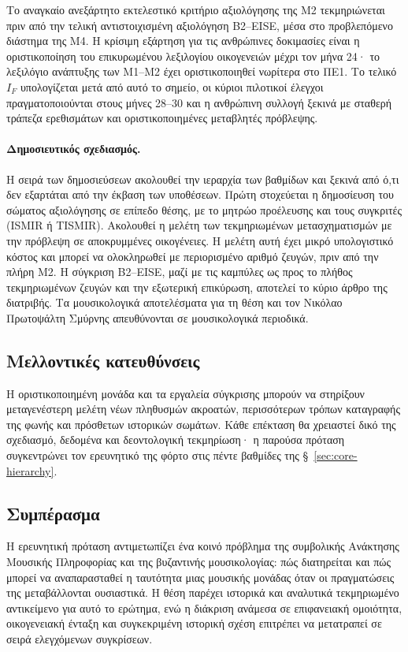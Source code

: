 \documentclass[11pt,a4paper]{article}
\begin{document}
Το αναγκαίο ανεξάρτητο εκτελεστικό κριτήριο αξιολόγησης της M2 τεκμηριώνεται πριν από την τελική αντιστοιχισμένη αξιολόγηση B2--EISE, μέσα στο προβλεπόμενο διάστημα της M4. Η κρίσιμη εξάρτηση για τις ανθρώπινες δοκιμασίες είναι η οριστικοποίηση του επικυρωμένου λεξιλογίου οικογενειών μέχρι τον μήνα 24· το λεξιλόγιο ανάπτυξης των M1--M2 έχει οριστικοποιηθεί νωρίτερα στο ΠΕ1. Το τελικό $I_F$ υπολογίζεται μετά από αυτό το σημείο, οι κύριοι πιλοτικοί έλεγχοι πραγματοποιούνται στους μήνες 28--30 και η ανθρώπινη συλλογή ξεκινά με σταθερή τράπεζα ερεθισμάτων και οριστικοποιημένες μεταβλητές πρόβλεψης.

\paragraph{Δημοσιευτικός σχεδιασμός.} Η σειρά των δημοσιεύσεων ακολουθεί την ιεραρχία των βαθμίδων και ξεκινά από ό,τι δεν εξαρτάται από την έκβαση των υποθέσεων. Πρώτη στοχεύεται η δημοσίευση του σώματος αξιολόγησης σε επίπεδο θέσης, με το μητρώο προέλευσης και τους συγκριτές (ISMIR ή TISMIR). Ακολουθεί η μελέτη των τεκμηριωμένων μετασχηματισμών με την πρόβλεψη σε αποκρυμμένες οικογένειες. Η μελέτη αυτή έχει μικρό υπολογιστικό κόστος και μπορεί να ολοκληρωθεί με περιορισμένο αριθμό ζευγών, πριν από την πλήρη M2. Η σύγκριση B2--EISE, μαζί με τις καμπύλες ως προς το πλήθος τεκμηριωμένων ζευγών και την εξωτερική επικύρωση, αποτελεί το κύριο άρθρο της διατριβής. Τα μουσικολογικά αποτελέσματα για τη θέση και τον Νικόλαο Πρωτοψάλτη Σμύρνης απευθύνονται σε μουσικολογικά περιοδικά.


\subsection{Μελλοντικές κατευθύνσεις}

Η οριστικοποιημένη μονάδα και τα εργαλεία σύγκρισης μπορούν να στηρίξουν μεταγενέστερη μελέτη νέων πληθυσμών ακροατών, περισσότερων τρόπων καταγραφής της φωνής και πρόσθετων ιστορικών σωμάτων. Κάθε επέκταση θα χρειαστεί δικό της σχεδιασμό, δεδομένα και δεοντολογική τεκμηρίωση· η παρούσα πρόταση συγκεντρώνει τον ερευνητικό της φόρτο στις πέντε βαθμίδες της §~\ref{sec:core-hierarchy}.

\subsection{Συμπέρασμα}

Η ερευνητική πρόταση αντιμετωπίζει ένα κοινό πρόβλημα της συμβολικής Ανάκτησης Μουσικής Πληροφορίας και της βυζαντινής μουσικολογίας: πώς διατηρείται και πώς μπορεί να αναπαρασταθεί η ταυτότητα μιας μουσικής μονάδας όταν οι πραγματώσεις της μεταβάλλονται ουσιαστικά. Η θέση παρέχει ιστορικά και αναλυτικά τεκμηριωμένο αντικείμενο για αυτό το ερώτημα, ενώ η διάκριση ανάμεσα σε επιφανειακή ομοιότητα, οικογενειακή ένταξη και συγκεκριμένη ιστορική σχέση επιτρέπει να μετατραπεί σε σειρά ελεγχόμενων συγκρίσεων.
\end{document}
